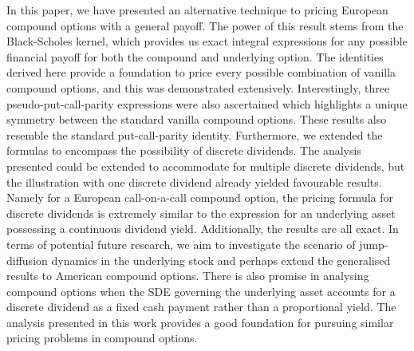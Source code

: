 In this paper, we have presented an alternative technique to pricing European compound options with a general payoff. The power of this result stems from the Black-Scholes kernel, which provides us exact integral expressions for any possible financial payoff for both the compound and underlying option. The identities derived here provide a foundation to price every possible combination of vanilla compound options, and this was demonstrated extensively. Interestingly, three pseudo-put-call-parity expressions were also ascertained which highlights a unique symmetry between the standard vanilla compound options. These results also resemble the standard put-call-parity identity. Furthermore, we extended the formulas to encompass the possibility of discrete dividends. The analysis presented could be extended to accommodate for multiple discrete dividends, but the illustration with one discrete dividend already yielded favourable results. Namely for a European call-on-a-call compound option, the pricing formula for discrete dividends is extremely similar to the expression for an underlying asset possessing a continuous dividend yield. Additionally, the results are all exact. In terms of potential future research, we aim to investigate the scenario of jump-diffusion dynamics in the underlying stock and perhaps extend the generalised results to American compound options. There is also promise in analysing compound options when the SDE governing the underlying asset accounts for a discrete dividend as a fixed cash payment rather than a proportional yield. The analysis presented in this work provides a good foundation for pursuing similar pricing problems in compound options.
